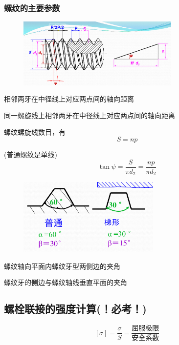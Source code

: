 \documentclass[twocolumn]{ctexart}
\begin{document}
\subsubsection{螺纹的主要参数}
        \begin{figure}[H]
            \centering
            \includegraphics[width=8cm]{img/6.png}
            \end{figure}
            \begin{description}[leftmargin=1.7cm,style=nextline,nosep]%
              \item[螺 距 P]  相邻两牙在中径线上对应两点间的轴向距离
              \item[导程 S] 同一螺旋线上相邻两牙在中径线上对应两点间的轴向距离
              \item[线数] 螺纹螺旋线数目，有
              $$
              S=np
              $$
              \item[螺纹升角] (普通螺纹是单线)
              $$ \tan \psi=\frac{S}{\pi d_2}=\frac{np}{\pi d_2}
              $$ 
                      \begin{figure}[H]
                          \centering
                          \includegraphics[width=7cm]{img/7.png}
                          \end{figure}
              \item[牙型角α] 螺纹轴向平面内螺纹牙型两侧边的夹角
              \item[牙侧角β] 螺纹牙的侧边与螺纹轴线垂直平面的夹角
            \end{description}
\subsection{螺栓联接的强度计算(！必考！)}
$$
[\sigma]=\frac{\sigma}{S}=\frac{\text{屈服极限}}{\text{安全系数}}
$$
\end{document}
